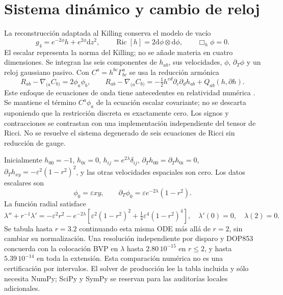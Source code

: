 \documentclass[11pt,a4paper]{article}
\newcommand{\eps}{\varepsilon}
\newcommand{\dd}{\mathrm d}
\newcommand{\Ric}{\operatorname{Ric}}
\begin{document}
\section{Sistema dinámico y cambio de reloj}
La reconstrucción adaptada al Killing conserva el modelo de vacío
\begin{equation}
 g_4=e^{-2\phi}h+e^{2\phi}\dd z^2,\qquad
 \Ric[h]=2\dd\phi\otimes\dd\phi,\qquad\Box_h\phi=0.
\end{equation}
El escalar representa la norma del Killing; no se añade materia en cuatro dimensiones. Se integran las seis componentes de $h_{ab}$, sus velocidades, $\phi$, $\partial_T\phi$ y un reloj gaussiano pasivo. Con $C^a=h^{bc}\Gamma^a_{bc}$ se usa la reducción armónica
\begin{equation}
 R_{ab}-\nabla_{(a}C_{b)}=2\phi_a\phi_b,
 \qquad R_{ab}-\nabla_{(a}C_{b)}
 =-\tfrac12h^{cd}\partial_c\partial_dh_{ab}+Q_{ab}(h,\partial h).
\end{equation}
Este enfoque de ecuaciones de onda tiene antecedentes en relatividad numérica \cite{Pretorius}. Se mantiene el término $C^a\phi_a$ de la ecuación escalar covariante; no se descarta suponiendo que la restricción discreta es exactamente cero. Los signos y contracciones se contrastan con una implementación independiente del tensor de Ricci. No se resuelve el sistema degenerado de seis ecuaciones de Ricci sin reducción de gauge.

Inicialmente $h_{00}=-1$, $h_{0i}=0$, $h_{ij}=e^{2\lambda}\delta_{ij}$, $\partial_T h_{00}=\partial_T h_{0i}=0$, $\partial_T h_{xy}=-\eps^2(1-r^2)^2$, y las otras velocidades espaciales son cero. Los datos escalares son
\begin{equation}
 \phi_0=\eps xy,\qquad \partial_T\phi_0=\eps e^{-2\lambda}(1-r^2).
\end{equation}
La función radial satisface
\begin{equation}
 \lambda''+r^{-1}\lambda'=-\eps^2r^2-e^{-2\lambda}
 \left[\eps^2(1-r^2)^2+\tfrac14\eps^4(1-r^2)^4\right],
 \quad\lambda'(0)=0,\quad\lambda(2)=0.
\end{equation}
Se tabula hasta $r=3.2$ continuando esta misma ODE más allá de $r=2$, sin cambiar su normalización. Una resolución independiente por disparo y DOP853 concuerda con la colocación BVP en $\lambda$ hasta $2.80\,10^{-15}$ en $r\leq2$, y hasta $5.39\,10^{-14}$ en toda la extensión. Esta comparación numérica no es una certificación por intervalos. El solver de producción lee la tabla incluida y sólo necesita NumPy; SciPy y SymPy se reservan para las auditorías locales adicionales.
\end{document}
